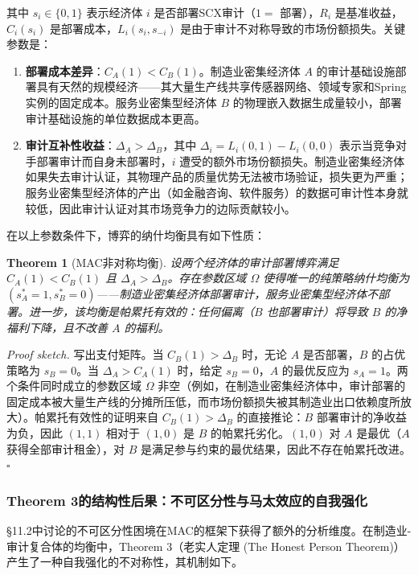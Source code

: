 \documentclass[12pt,a4paper]{ctexart}
\newtheorem{theorem}{Theorem}[section]
\theoremstyle{definition}
\theoremstyle{remark}
\begin{document}
其中 $s_i \in \{0, 1\}$ 表示经济体 $i$ 是否部署SCX审计（$1 = $ 部署），$R_i$ 是基准收益，$C_i(s_i)$ 是部署成本，$L_i(s_i, s_{-i})$ 是由于审计不对称导致的市场份额损失。关键参数是：

\begin{enumerate}[label=(\roman*)]
    \item \textbf{部署成本差异}：$C_A(1) < C_B(1)$。制造业密集经济体 $A$ 的审计基础设施部署具有天然的规模经济——其大量生产线共享传感器网络、领域专家和Spring实例的固定成本。服务业密集型经济体 $B$ 的物理嵌入数据生成量较小，部署审计基础设施的单位数据成本更高。
    \item \textbf{审计互补性收益}：$\Delta_A > \Delta_B$，其中 $\Delta_i = L_i(0, 1) - L_i(0, 0)$ 表示当竞争对手部署审计而自身未部署时，$i$ 遭受的额外市场份额损失。制造业密集经济体如果失去审计认证，其物理产品的质量优势无法被市场验证，损失更为严重；服务业密集型经济体的产出（如金融咨询、软件服务）的数据可审计性本身就较低，因此审计认证对其市场竞争力的边际贡献较小。
\end{enumerate}

在以上参数条件下，博弈的纳什均衡具有如下性质：

\begin{theorem}[MAC非对称均衡]
\label{thm:mac-asymmetric}
设两个经济体的审计部署博弈满足 $C_A(1) < C_B(1)$ 且 $\Delta_A > \Delta_B$。存在参数区域 $\Omega$ 使得唯一的纯策略纳什均衡为 $(s_A^* = 1, s_B^* = 0)$——制造业密集经济体部署审计，服务业密集型经济体不部署。进一步，该均衡是帕累托有效的：任何偏离（$B$ 也部署审计）将导致 $B$ 的净福利下降，且不改善 $A$ 的福利。
\end{theorem}

\textit{Proof sketch.} 写出支付矩阵。当 $C_B(1) > \Delta_B$ 时，无论 $A$ 是否部署，$B$ 的占优策略为 $s_B = 0$。当 $\Delta_A > C_A(1)$ 时，给定 $s_B = 0$，$A$ 的最优反应为 $s_A = 1$。两个条件同时成立的参数区域 $\Omega$ 非空（例如，在制造业密集经济体中，审计部署的固定成本被大量生产线的分摊所压低，而市场份额损失被其制造业出口依赖度所放大）。帕累托有效性的证明来自 $C_B(1) > \Delta_B$ 的直接推论：$B$ 部署审计的净收益为负，因此 $(1, 1)$ 相对于 $(1, 0)$ 是 $B$ 的帕累托劣化。$(1, 0)$ 对 $A$ 是最优（$A$ 获得全部审计租金），对 $B$ 是满足参与约束的最优结果，因此不存在帕累托改进。\hfill $\square$

\subsubsection*{Theorem 3的结构性后果：不可区分性与马太效应的自我强化}

§11.2中讨论的不可区分性困境在MAC的框架下获得了额外的分析维度。在制造业-审计复合体的均衡中，Theorem 3（老实人定理 (The Honest Person Theorem)）产生了一种自我强化的不对称性，其机制如下。
\end{document}
